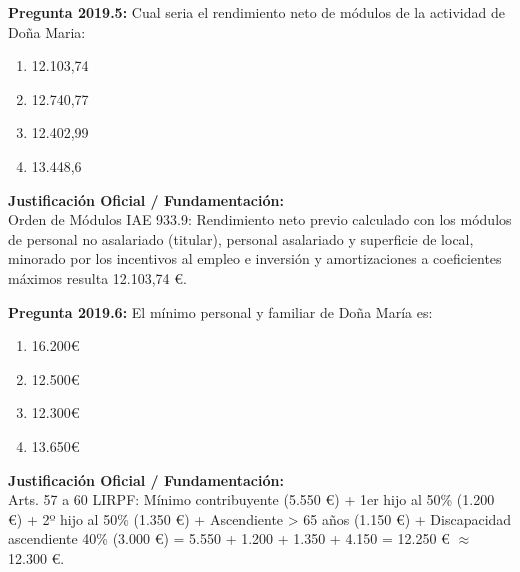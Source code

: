 \documentclass[11pt,a4paper,openany]{article}
\begin{document}
\noindent\textbf{\sffamily Pregunta 2019.5:} Cual seria el rendimiento neto de módulos de la actividad de Doña Maria:\\[0.15cm]
\begin{enumerate}[label=\textbf{\alph*)},leftmargin=1.8em,itemsep=1.5pt,topsep=2pt,partopsep=0pt,parsep=0pt]
    \item 12.103,74
    \item 12.740,77
    \item 12.402,99
    \item 13.448,6
\end{enumerate}
\begin{solucionBox}
\textbf{Justificación Oficial / Fundamentación:}\\[0.1cm]
Orden de Módulos IAE 933.9: Rendimiento neto previo calculado con los módulos de personal no asalariado (titular), personal asalariado y superficie de local, minorado por los incentivos al empleo e inversión y amortizaciones a coeficientes máximos resulta 12.103,74 \euro{}.
\end{solucionBox}
\vspace{0.35cm}

\noindent\textbf{\sffamily Pregunta 2019.6:} El mínimo personal y familiar de Doña María es:\\[0.15cm]
\begin{enumerate}[label=\textbf{\alph*)},leftmargin=1.8em,itemsep=1.5pt,topsep=2pt,partopsep=0pt,parsep=0pt]
    \item 16.200\euro{}
    \item 12.500\euro{}
    \item 12.300\euro{}
    \item 13.650\euro{}
\end{enumerate}
\begin{solucionBox}
\textbf{Justificación Oficial / Fundamentación:}\\[0.1cm]
Arts. 57 a 60 LIRPF: Mínimo contribuyente (5.550 \euro{}) + 1er hijo al 50\% (1.200 \euro{}) + 2º hijo al 50\% (1.350 \euro{}) + Ascendiente > 65 años (1.150 \euro{}) + Discapacidad ascendiente 40\% (3.000 \euro{}) = 5.550 + 1.200 + 1.350 + 4.150 = 12.250 \euro{} $\approx$  12.300 \euro{}.
\end{solucionBox}
\vspace{0.35cm}
\end{document}

